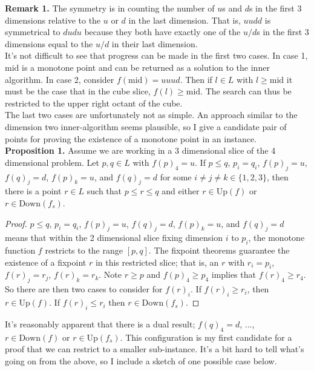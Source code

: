\documentclass{article}
\newcommand{\mi}{\text{mid}}
\newcommand{\up}{\text{Up}}
\newcommand{\down}{\text{Down}}
\begin{document}
  \textbf{Remark 1.} The symmetry is in counting the number of $u$s and $d$s in the first 3
  dimensions relative to the $u$ or $d$ in the last dimension. That is, $uudd$ is symmetrical to
  $dudu$ because they both have exactly one of the $u/d$s in the first 3 dimensions equal to the $u/d$ in
  their last dimension. \\

  It's not difficult to see that progress can be made in the first two cases. In case 1,
  $\mi$ is a monotone point and can be returned as a solution to the inner algorithm. In case 2,
  consider $f(\mi) = uuud$. Then if $l \in L$ with $l \geq \mi$ it must be the case that
  in the cube slice, $f(l) \geq \mi$. The search can thus be restricted to the upper right
  octant of the cube. \\

  The last two cases are unfortunately not as simple. An approach similar to the dimension two
  inner-algorithm seems plausible, so I give a candidate pair of points for proving
  the existence of a monotone point in an instance. \\

  \textbf{Proposition 1.} Assume we are working in a 3 dimensional slice of the 4 dimensional problem.
  Let $p, q \in L$ with $f(p)_4 = u$. If $p \leq q$, $p_i = q_i$, 
  $f(p)_j = u$, $f(q)_j = d$, $f(p)_k = u$, and $f(q)_j = d$ for some $i \neq j \neq k \in \{1, 2, 3\}$,
  then there is a point $r \in L$ such that $p \leq r \leq q$ and either $r \in \up(f)$ or $r \in \down(f_s)$.

  \begin{proof}
    $p \leq q$, $p_i = q_i$, $f(p)_j = u$, $f(q)_j = d$, $f(p)_k = u$, and $f(q)_j = d$ means that
    within the 2 dimensional slice fixing dimension $i$ to $p_i$, the monotone function $f$ restricts to
    the range $[p, q]$. The fixpoint theorems guarantee the existence of a fixpoint $r$ in this
    restricted slice; that is, an $r$ with $r_i = p_i$, $f(r)_j = r_j$, $f(r)_k = r_k$. Note
    $r \geq p$ and $f(p)_4 \geq p_4$ implies that $f(r)_4 \geq r_4$. So there are then two cases to consider
    for $f(r)_i$. If $f(r)_i \geq r_i$, then $r \in \up(f)$. If $f(r)_i \leq r_i$ then $r \in \down(f_s)$.
  \end{proof}

  It's reasonably apparent that there is a dual result; $f(q)_4 = d$, ..., $r \in \down(f)$
  or $r \in \up(f_s)$. This configuration is my first candidate for a proof that we can restrict to a smaller
  sub-instance. It's a bit hard to tell what's going on from the above, so I include a sketch of one possible case below.
  
\end{document}
